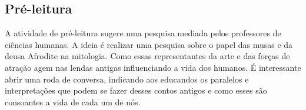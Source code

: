 \documentclass[12pt]{extarticle}
\begin{document}




\subsection{Pré-leitura}

 A atividade de pré-leitura sugere uma pesquisa mediada pelos professores de
 ciências humanas. A ideia é realizar uma pesquisa sobre o papel das musas e da
 deusa Afrodite na mitologia. Como essas representantes da arte e das forças de
 atração agem nas lendas antigas influenciando a vida dos humanos. É
 interessante abrir uma roda de conversa, indicando aos educandos os paralelos
 e interpretações que podem se fazer desses contos antigos e como esses são
 consoantes a vida de cada um de nós.


 
 
\end{document}
